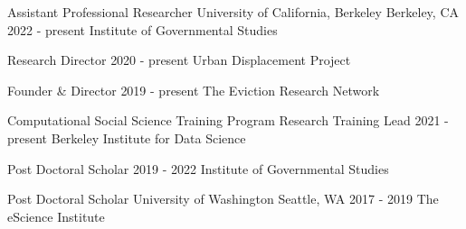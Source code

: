 

\begin{cventries}



  \cventry
    {Assistant Professional Researcher} %
    {University of California, Berkeley} %
    {Berkeley, CA} %
    {2022 - present} %
    {Institute of Governmental Studies}
    


  \cventry
    {Research Director} %
    {} %
    {} %
    {2020 - present} %
    {Urban Displacement Project}

  \cventry
    {Founder \& Director} %
    {} %
    {} %
    {2019 - present} %
    {The Eviction Research Network}    

  \cventry
    {Computational Social Science Training Program Research Training Lead} %
    {} %
    {} %
    {2021 - present} %
    {Berkeley Institute for Data Science}
    
  \cventry
    {Post Doctoral Scholar} %
    {} %
    {} %
    {2019 - 2022} %
    {Institute of Governmental Studies\newline}

  \cventry
    {Post Doctoral Scholar} %
    {University of Washington} %
    {Seattle, WA} %
    {2017 - 2019} %
    {The eScience Institute}

\end{cventries}